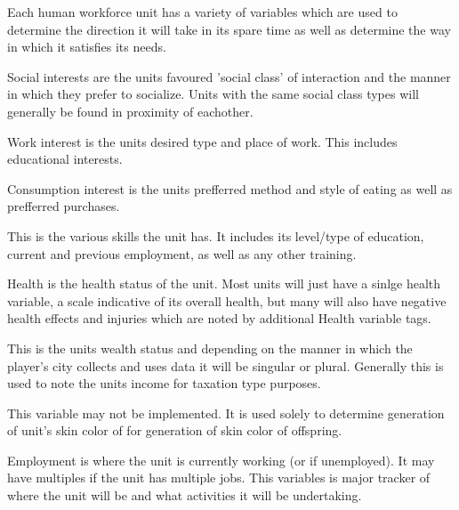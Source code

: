 

Each human workforce unit has a variety of variables which are used to determine the direction it will take in its spare time as well as determine the way in which it satisfies its needs.



Social interests are the units favoured 'social class' of interaction and the manner in which they prefer to socialize. Units with the same social class types will generally be found in proximity of eachother.

Work interest is the units desired type and place of work. This includes educational interests.

Consumption interest is the units prefferred method and style of eating as well as prefferred purchases. 

This is the various skills the unit has. It includes its level/type of education, current and previous employment, as well as any other training.

Health is the health status of the unit. Most units will just have a sinlge health variable, a scale indicative of its overall health, but many will also have negative health effects and injuries which are noted by additional Health variable tags.

This is the units wealth status and depending on the manner in which the player's city collects and uses data it will be singular or plural. Generally this is used to note the units income for taxation type purposes.

This variable may not be implemented. It is used solely to determine generation of unit's skin color of for generation of skin color of offspring.

Employment is where the unit is currently working (or if unemployed). It may have multiples if the unit has multiple jobs. This variables is major tracker of where the unit will be and what activities it will be undertaking.

